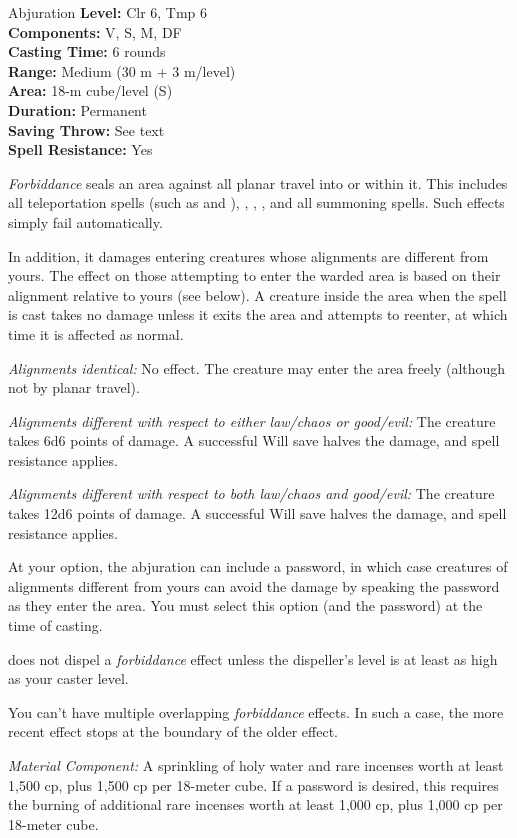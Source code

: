 {Abjuration}
{
	\textbf{Level:}
	Clr 6, Tmp 6\\
	\textbf{Components:}
	V, S, M, DF\\
	\textbf{Casting Time:}
	6 rounds\\
	\textbf{Range:}
	Medium (30 m + 3 m/level)\\
	\textbf{Area:}
	18-m cube/level (S)\\
	\textbf{Duration:}
	Permanent\\
	\textbf{Saving Throw:}
	See text\\
	\textbf{Spell Resistance:}
	Yes\\
}
{
	\emph{Forbiddance} seals an area against all planar travel into or within it. This includes all teleportation spells (such as  and ), , , , and all summoning spells. Such effects simply fail automatically.

	In addition, it damages entering creatures whose alignments are different from yours. The effect on those attempting to enter the warded area is based on their alignment relative to yours (see below). A creature inside the area when the spell is cast takes no damage unless it exits the area and attempts to reenter, at which time it is affected as normal.

	\textit{Alignments identical:}
	No effect. The creature may enter the area freely (although not by planar travel).

	\textit{Alignments different with respect to either law/chaos or good/evil:}
	The creature takes 6d6 points of damage. A successful Will save halves the damage, and spell resistance applies.

	\textit{Alignments different with respect to both law/chaos and good/evil:}
	The creature takes 12d6 points of damage. A successful Will save halves the damage, and spell resistance applies.

	At your option, the abjuration can include a password, in which case creatures of alignments different from yours can avoid the damage by speaking the password as they enter the area. You must select this option (and the password) at the time of casting.

	 does not dispel a \emph{forbiddance} effect unless the dispeller's level is at least as high as your caster level.

	You can't have multiple overlapping \emph{forbiddance} effects. In such a case, the more recent effect stops at the boundary of the older effect.

	\textit{Material Component:}
	A sprinkling of holy water and rare incenses worth at least 1,500 cp, plus 1,500 cp per 18-meter cube. If a password is desired, this requires the burning of additional rare incenses worth at least 1,000 cp, plus 1,000 cp per 18-meter cube.

}
